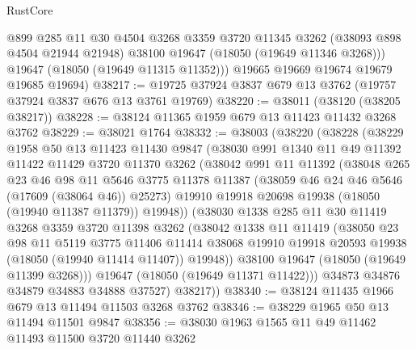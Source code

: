 \begin{lexlean}{RustCore}
\begin{coremodule}
          @899
          @285
          @11
          @30
          @4504
          @3268
          @3359
          @3720
          @11345
          @3262
          (@38093 @898 @4504 @21944 @21948)
          @38100
          @19647
          (@18050 (@19649 @11346 @3268)))
        @19647
        (@18050 (@19649 @11315 @11352)))
      @19665
      @19669
      @19674
      @19679
      @19685
      @19694)
@38217 := @19725 @37924 @3837 @679 @13 @3762 (@19757 @37924 @3837 @676 @13 @3761 @19769)
@38220 := @38011 (@38120 (@38205 @38217))
@38228 := @38124 @11365 @1959 @679 @13 @11423 @11432 @3268 @3762
@38229 := @38021 @1764
@38332 := @38003
    (@38220
      (@38228
        (@38229
          @1958
          @50
          @13
          @11423
          @11430
          @9847
          (@38030
            @991
            @1340
            @11
            @49
            @11392
            @11422
            @11429
            @3720
            @11370
            @3262
            (@38042
              @991
              @11
              @11392
              (@38048
                @265
                @23
                @46
                @98
                @11
                @5646
                @3775
                @11378
                @11387
                (@38059 @46 @24 @46 @5646 (@17609 (@38064 @46)) @25273)
                @19910
                @19918
                @20698
                @19938
                (@18050 (@19940 @11387 @11379))
                @19948))
            (@38030
              @1338
              @285
              @11
              @30
              @11419
              @3268
              @3359
              @3720
              @11398
              @3262
              (@38042
                @1338
                @11
                @11419
                (@38050
                  @23
                  @98
                  @11
                  @5119
                  @3775
                  @11406
                  @11414
                  @38068
                  @19910
                  @19918
                  @20593
                  @19938
                  (@18050 (@19940 @11414 @11407))
                  @19948))
              @38100
              @19647
              (@18050 (@19649 @11399 @3268)))
            @19647
            (@18050 (@19649 @11371 @11422)))
          @34873
          @34876
          @34879
          @34883
          @34888
          @37527)
        @38217))
@38340 := @38124 @11435 @1966 @679 @13 @11494 @11503 @3268 @3762
@38346 := @38229 @1965 @50 @13 @11494 @11501 @9847
@38356 := @38030 @1963 @1565 @11 @49 @11462 @11493 @11500 @3720 @11440 @3262

\end{coremodule}
\end{lexlean}
